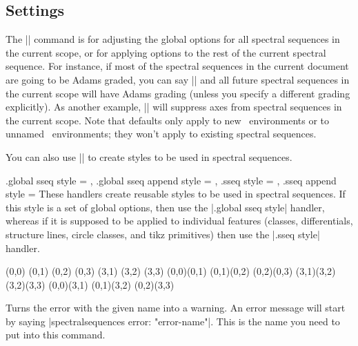 \begin{sseqdata}[name = basic, cohomological Serre grading]
\subsection{Settings}
\begin{command}{\sseqset{}}%
The |\sseqset| command is for adjusting the global options for all spectral
sequences in the current scope, or for applying options to the rest of the
current spectral sequence. For instance, if most of the spectral sequences in
the current document are going to be Adams graded, you can say%
|| and all future spectral sequences in the current scope
will have Adams grading (unless you specify a different grading explicitly). As
another example, || will suppress axes from spectral sequences
in the current scope. Note that defaults only apply to new \sseqdataenv\
environments or to unnamed \sseqpageenv\ environments; they won't apply to
existing spectral sequences.

You can also use |\sseqset| to create styles to be used in spectral sequences.
\begin{keylist}{
    .global sseq style = ,
    .global sseq append style = ,
    .sseq style = ,
    .sseq append style = \meta{keys}
}%
These handlers create reusable styles to be used in spectral sequences. If this
style is a set of global options, then use the |.global sseq style| handler,
whereas if it is supposed to be applied to individual features (classes,
differentials, structure lines, circle classes, and tikz primitives) then use
the |.sseq style| handler.
\begin{codeexample}[width=6cm]
\begin{sseqpage}[ mysseq ]
\class(0,0) \class(0,1) \class(0,2) \class(0,3)
\class(3,1) \class(3,2) \class(3,3)
\structline(0,0)(0,1) \structline(0,1)(0,2)
\structline(0,2)(0,3)
\structline(3,1)(3,2) \structline(3,2)(3,3)
\structline[htwostruct](0,0)(3,1)
\structline[htwostruct](0,1)(3,2)
\structline[htwostruct](0,2)(3,3)
\end{sseqpage}
\end{codeexample}
\end{keylist}
\end{command}

\begin{command}{\SseqErrorToWarning{}}%
Turns the error with the given name into a warning. An error message will start
by saying \let\eatclnifpresent\empty|spectralsequences error: "error-name"|.
This is the name you need to put into this command.
\end{command}


\end{sseqdata}
